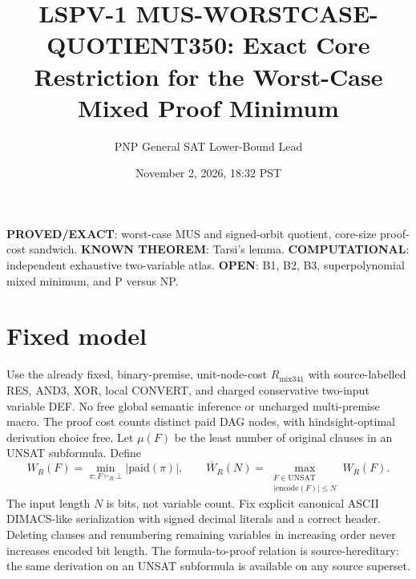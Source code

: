 \documentclass[11pt]{article}
\title{LSPV-1 MUS-WORSTCASE-QUOTIENT350: Exact Core Restriction for the Worst-Case Mixed Proof Minimum}
\author{PNP General SAT Lower-Bound Lead}
\date{November 2, 2026, 18:32 PST}
\begin{document}
\maketitle
\noindent \textbf{PROVED/EXACT}: worst-case MUS and signed-orbit quotient, core-size proof-cost sandwich. \textbf{KNOWN THEOREM}: Tarsi's lemma. \textbf{COMPUTATIONAL}: independent exhaustive two-variable atlas. \textbf{OPEN}: B1, B2, B3, superpolynomial mixed minimum, and P versus NP.

\section*{Fixed model}
Use the already fixed, binary-premise, unit-node-cost $R_{\mathrm{mix341}}$ with source-labelled RES, AND3, XOR, local CONVERT, and charged conservative two-input variable DEF. No free global semantic inference or uncharged multi-premise macro. The proof cost counts distinct paid DAG nodes, with hindsight-optimal derivation choice free. Let $\mu(F)$ be the least number of original clauses in an UNSAT subformula. Define
\[
W_R(F)=\min_{\pi:F\vdash_R\bot}|\mathrm{paid}(\pi)|,\qquad
\overline W_R(N)=\max_{\substack{F\in\mathrm{UNSAT}\\|\mathrm{encode}(F)|\le N}}W_R(F).
\]
The input length $N$ is bits, not variable count. Fix explicit canonical ASCII DIMACS-like serialization with signed decimal literals and a correct header. Deleting clauses and renumbering remaining variables in increasing order never increases encoded bit length. The formula-to-proof relation is source-hereditary: the same derivation on an UNSAT subformula is available on any source superset.
\end{document}
